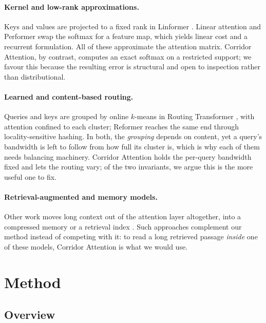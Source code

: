 \documentclass[11pt]{article}
\begin{document}
\paragraph{Kernel and low-rank approximations.} Keys and values are projected
to a fixed rank in Linformer \citep{wang2020linformer}. Linear attention
\citep{katharopoulos2020linear} and Performer \citep{choromanski2021performer}
swap the softmax for a feature map, which yields linear cost and a recurrent
formulation. All of these approximate the attention matrix. Corridor
Attention, by contrast, computes an exact softmax on a restricted support; we
favour this because the resulting error is structural and open to inspection
rather than distributional.

\paragraph{Learned and content-based routing.} Queries and keys are grouped
by online $k$-means in Routing Transformer \citep{roy2021efficient}, with
attention confined to each cluster; Reformer \citep{kitaev2020reformer}
reaches the same end through locality-sensitive hashing. In both, the
\emph{grouping} depends on content, yet a query's bandwidth is left to follow
from how full its cluster is, which is why each of them needs balancing
machinery. Corridor Attention holds the per-query bandwidth fixed and lets
the routing vary; of the two invariants, we argue this is the more useful
one to fix.

\paragraph{Retrieval-augmented and memory models.} Other work moves long
context out of the attention layer altogether, into a compressed memory or a
retrieval index \citep{rae2020compressive,borgeaud2022improving}. Such
approaches complement our method instead of competing with it: to read a long
retrieved passage \emph{inside} one of these models, Corridor Attention is
what we would use.

\section{Method}\label{sec:method}

\subsection{Overview}\label{sec:overview}
\end{document}
